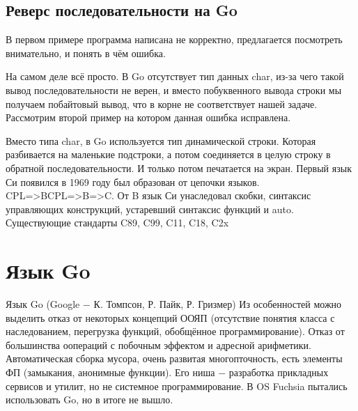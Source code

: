 \documentclass[a4paper, 12pt, titlepage, finall]{extreport}
\begin{document}
        \subsection{Реверс последовательности на Go}
            В первом примере программа написана не корректно, предлагается посмотреть внимательно, и понять в чём ошибка.
            
            
            На самом деле всё просто. В Go отсутствует тип данных char, из-за чего такой вывод последовательности не верен, и вместо
            побуквенного вывода строки мы получаем побайтовый вывод, что в корне не соответствует нашей задаче.
            Рассмотрим второй пример на котором данная ошибка исправлена.
            
            
            Вместо типа char, в Go используется тип динамической строки. Которая разбивается на маленькие подстроки, а потом соединяется в целую строку в обратной последовательности.
            И только потом печатается на экран.
            Первый язык Си появился в 1969 году был образован от цепочки языков. CPL=>BCPL=>B=>C. От B язык Си унаследовал
            скобки, синтаксис управляющих конструкций, устаревший синтаксис функций и auto.
            Существующие стандарты C89, C99, C11, C18, C2x
        \section{Язык Go}
            Язык Go (Google $-$ К. Томпсон, Р. Пайк, Р. Гризмер)
            Из особенностей можно выделить отказ от некоторых концепций ООЯП 
            (отсутствие понятия класса с наследованием, перегрузка функций, обобщённое программирование).
            Отказ от большинства оопераций с побочным эффектом и адресной арифметики.
            Автоматическая сборка мусора, очень развитая многопточность, есть элементы ФП (замыкания, анонимные функции).
            Его ниша $-$ разработка прикладных сервисов и утилит, но не системное программирование.
            В OS Fuchsia пытались использовать Go, но в итоге не вышло.
\end{document}
